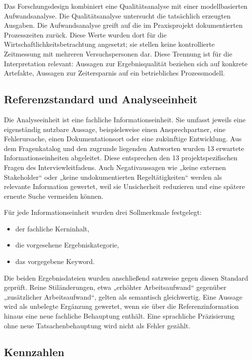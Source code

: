 \documentclass[
  10pt,
  ngerman,
  a4paper,
  toc=graduated,
  numbers=noenddot,
  headings=standardclasses,
  nonumberlist
]{scrartcl}
\begin{document}
Das Forschungsdesign kombiniert eine Qualitätsanalyse mit einer modellbasierten Aufwandsanalyse. Die Qualitätsanalyse untersucht die tatsächlich erzeugten Ausgaben. Die Aufwandsanalyse greift auf die im Praxisprojekt dokumentierten Prozesszeiten zurück. Diese Werte wurden dort für die Wirtschaftlichkeitsbetrachtung angesetzt; sie stellen keine kontrollierte Zeitmessung mit mehreren Versuchspersonen dar. Diese Trennung ist für die Interpretation relevant: Aussagen zur Ergebnisqualität beziehen sich auf konkrete Artefakte, Aussagen zur Zeitersparnis auf ein betriebliches Prozessmodell.

\subsection{Referenzstandard und Analyseeinheit}

Die Analyseeinheit ist eine fachliche Informationseinheit. Sie umfasst jeweils eine eigenständig nutzbare Aussage, beispielsweise einen Ansprechpartner, eine Fehlerursache, einen Dokumentationsort oder eine zukünftige Entwicklung. Aus dem Fragenkatalog und den zugrunde liegenden Antworten wurden 13 erwartete Informationseinheiten abgeleitet. Diese entsprechen den 13 projektspezifischen Fragen des Interviewleitfadens. Auch Negativaussagen wie „keine externen Stakeholder“ oder „keine undokumentierten Regeltätigkeiten“ werden als relevante Information gewertet, weil sie Unsicherheit reduzieren und eine spätere erneute Suche vermeiden können.

Für jede Informationseinheit wurden drei Sollmerkmale festgelegt:

\begin{itemize}
\item der fachliche Kerninhalt,
\item die vorgesehene Ergebniskategorie,
\item das vorgegebene Keyword.
\end{itemize}

Die beiden Ergebnisdateien wurden anschließend satzweise gegen diesen Standard geprüft. Reine Stiländerungen, etwa „erhöhter Arbeitsaufwand“ gegenüber „zusätzlicher Arbeitsaufwand“, gelten als semantisch gleichwertig. Eine Aussage wird als unbelegte Ergänzung gewertet, wenn sie über die Referenzinformation hinaus eine neue fachliche Behauptung enthält. Eine sprachliche Präzisierung ohne neue Tatsachenbehauptung wird nicht als Fehler gezählt.

\subsection{Kennzahlen}
\end{document}
